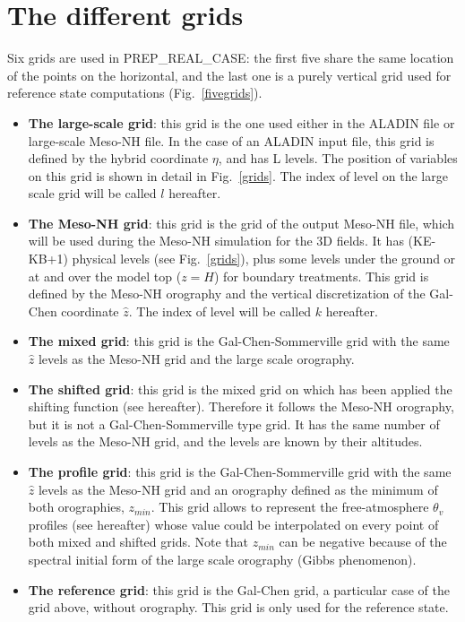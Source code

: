 \section{The different grids}
Six grids are used in PREP\_REAL\_CASE: the first five share the same
location of the points on the horizontal, and the last one is a purely
vertical grid used for reference state computations (Fig.~\ref{fivegrids}).
\begin{itemize}
\item
{\bf{The large-scale grid}}: this grid is the one used either in the ALADIN file
or large-scale Meso-NH file. In the case of an ALADIN input file, this grid is
defined by the hybrid coordinate $\eta$, and has L levels. The position of
variables on this grid is shown in detail in Fig.~\ref{grids}. The
index of level on the large scale grid will be called $l$ hereafter.
\item
{\bf{The Meso-NH grid}}: this grid is the grid of the output Meso-NH file, which will be
used during the Meso-NH simulation for the 3D fields. It has (KE-KB+1)
physical levels (see Fig.~\ref{grids}), plus some levels under the ground or
at and over the model top ($z=H$) for boundary treatments.
This grid is defined by the Meso-NH orography and the vertical discretization
of the Gal-Chen coordinate $\widehat{z}$. The index of level will be called
$k$ hereafter.
\item
{\bf{The mixed grid}}: this grid is the Gal-Chen-Sommerville grid with
the same $\widehat{z}$ levels as the Meso-NH grid and the large scale
orography.
\item
{\bf{The shifted grid}}: this grid is the mixed grid on which has been applied
the shifting function (see hereafter). Therefore it follows the Meso-NH
orography, but it is not a Gal-Chen-Sommerville type grid.
It has the same number of levels as the Meso-NH grid, and the
levels are known by their altitudes.
\item
{\bf{The profile grid}}: this grid is the Gal-Chen-Sommerville grid with
the same $\widehat{z}$ levels as the Meso-NH grid and an orography defined
as the minimum of both orographies, $z_{min}$.
This grid allows to represent the free-atmosphere $\theta_v$ profiles
(see hereafter) whose value could be interpolated
on every point of both mixed and shifted grids. Note that $z_{min}$ can be
negative because of the spectral initial form of the large scale orography
(Gibbs phenomenon).
\item
{\bf{The reference grid}}: this grid is the Gal-Chen grid, a particular case of the
grid above, without orography. This grid is only used for the reference state.
\end{itemize}

